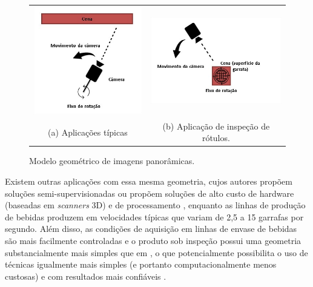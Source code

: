 \begin{figure}[ht]
    \centering
    \caption{Modelo geométrico de imagens panorâmicas.}    
    \begin{minipage}{\textwidth}
        \begin{tabular}{cc}
            \includegraphics[width=.4\linewidth]{TCC/Imagens/panoramica_padrao.jpg} 
            &
            \includegraphics[width=.5\linewidth]{TCC/Imagens/panoramica_trabalho.jpg}
            \\
            (a) Aplicações típicas & (b) Aplicação de inspeção de rótulos.
        \end{tabular}
    \end{minipage}
    \label{fig:gp}
\end{figure}
    
    Existem outras aplicações com essa mesma geometria, cujos autores propõem soluções semi-supervisionadas \cite{lee2000fast} ou propõem soluções de alto custo de hardware (baseadas em \textit{scanners} 3D) e de processamento \cite{Kovacs:2006}, enquanto as linhas de produção de bebidas produzem em velocidades típicas que variam de 2,5 a 15 garrafas por segundo. Além disso, as condições de aquisição em linhas de envase de bebidas são mais facilmente controladas e o produto sob inspeção possui uma geometria substancialmente mais simples que em \cite{lee2000fast,Kovacs:2006}, o que potencialmente possibilita o uso de técnicas igualmente mais simples (e portanto computacionalmente menos custosas) e com resultados mais confiáveis \cite{Park:2013}.
    
